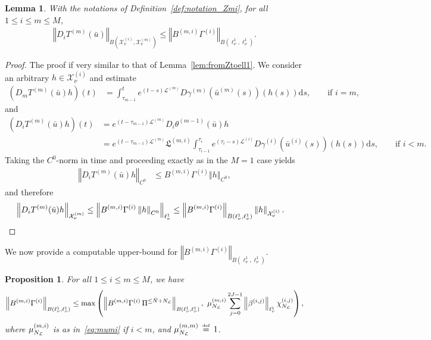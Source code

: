 \documentclass[10pt,a4paper]{article}
\theoremstyle{plain}
\newtheorem{proposition}[theorem]{Proposition}
\newtheorem{lemma}[theorem]{Lemma}
\renewcommand{\L}{\mathcal{L}}
\newcommand{\X}{\mathcal{X}}
\newcommand{\bu}{\bar{u}}
\newcommand{\bN}{\bar{N}}
\newcommand{\kL}{\mathfrak{L}}
\newcommand{\1}{\mathbf{1}}
\newcommand{\bydef}{\,\stackrel{\mbox{\tiny\textnormal{\raisebox{0ex}[0ex][0ex]{def}}}}{=}\,}
\newcommand{\NL}{N_{\text{\tiny{$\L$}}}}
\begin{document}
\begin{lemma}
With the notations of Definition~\ref{def:notation_Zmi}, for all $1\leq i\leq m\leq M$,
\begin{align*}
\left\Vert D_iT^{(m)}(\bu) \right\Vert_{B(\X_\nu^{(i)},\X_\nu^{(m)})} \leq \left\Vert B^{(m,i)}\Gamma^{(i)} \right\Vert_{B(\ell^1_\nu,\ell^1_\nu)}.
\end{align*}
\end{lemma}
%
\begin{proof}
The proof if very similar to that of Lemma~\ref{lem:fromZtoell1}. We consider an arbitrary $h\in\X_\nu^{(i)}$ and estimate
\begin{align}
\label{eq:DmTm}
\left( D_m T^{(m)}(\bu)h \right)(t) &= \int_{\tau_{m-1}}^{t} e^{ (t-s)\L^{(m)} }  D\gamma^{(m)}(\bu^{(m)}(s)) (h(s)) \mbox{d} s, \qquad \text{if }i=m,
\end{align}
and 
\begin{align}
\label{eq:DiTm}
\left( D_i T^{(m)}(\bu)h \right)(t) &= e^{ (t-\tau_{m-1})\L^{(m)}}D_i\theta^{(m-1)}(\bu)h \nonumber\\
& = e^{ (t-\tau_{m-1})\L^{(m)}}\kL^{(m,i)}\int_{\tau_{i-1}}^{\tau_i} e^{(\tau_i-s)\L^{(i)} }  D\gamma^{(i)}(\bu^{(i)}(s)) (h(s)) \mbox{d} s, \qquad \text{if }i<m.
\end{align}
Taking the $C^0$-norm in time and proceeding exactly as in the $M=1$ case yields
\begin{align*}
\left\Vert D_iT^{(m)}(\bu)h \right\Vert_{C^0} &\leq B^{(m,i)}  \Gamma^{(i)} \left\Vert h\right\Vert_{C^0},
\end{align*}
and therefore
\begin{align*}
\left\Vert D_iT^{(m)}(\bu)h \right\Vert_{\X_\nu^{(m)}} &\leq \left\Vert B^{(m,i)} \Gamma^{(i)}\left\Vert h\right\Vert_{C^0} \right\Vert_{\ell^1_\nu} 
\leq \left\Vert B^{(m,i)} \Gamma^{(i)} \right\Vert_{B(\ell^1_\nu,\ell^1_\nu)} \left\Vert h \right\Vert_{\X_\nu^{(i)}}. \qedhere
\end{align*}
\end{proof}
%
We now provide a computable upper-bound for $\left\Vert B^{(m,i)} \Gamma^{(i)} \right\Vert_{B(\ell^1_\nu,\ell^1_\nu)}$.
\begin{proposition}
For all $1\leq i\leq m\leq M$, we have 
\begin{align*}
\left\Vert B^{(m,i)} \Gamma^{(i)} \right\Vert_{B(\ell^1_\nu,\ell^1_\nu)} \leq \max \left(\left\Vert B^{(m,i)} \Gamma^{(i)} \,\Pi^{\leq \bN+\NL}\right\Vert_{B(\ell^1_\nu,\ell^1_\nu)},\ \mu^{(m,i)}_{\NL}\sum_{j=0}^{2J-1} \left\Vert \beta^{(i,j)}\right\Vert_{\ell^1_\nu}  \chi^{(i,j)}_{\NL} \right),
\end{align*}
where $\mu^{(m,i)}_{\NL}$ is as in~\eqref{eq:mumi} if $i<m$, and $\mu^{(m,m)}_{\NL} \bydef 1$.
\end{proposition}
\end{document}
